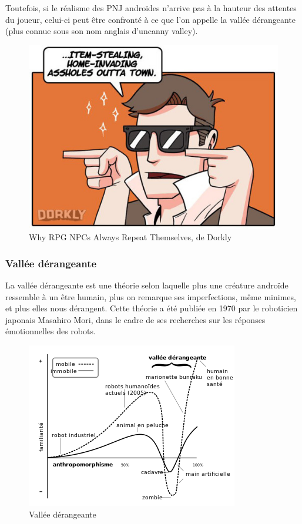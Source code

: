 \documentclass[a4paper, 12pt]{article} %
\begin{document}
Toutefois, si le réalisme des PNJ androïdes n’arrive pas à la hauteur des attentes du joueur, celui-ci peut être confronté à ce que l'on appelle la vallée dérangeante (plus connue sous son nom anglais d’uncanny valley).

\begin{figure}[!h]%
	\begin{center} 
		\includegraphics[width=0.60\columnwidth]{images/repeat4.png}%
		\caption{Why RPG NPCs Always Repeat Themselves, de Dorkly}%
	\end{center}
\end{figure}

\newpage
\subsubsection{Vallée dérangeante}

La vallée dérangeante est une théorie selon laquelle plus une créature androïde ressemble à un être humain, plus on remarque ses imperfections, même minimes, et plus elles nous dérangent. Cette théorie a été publiée en 1970 par le roboticien japonais Masahiro Mori, dans le cadre de ses recherches sur les réponses émotionnelles des robots.

\begin{figure}[!h]%
	\begin{center} 
		\includegraphics[width=0.60\columnwidth]{images/uncannyValley.png}%
		\caption{Vallée dérangeante}%
	\end{center}
\end{figure}
\end{document}
